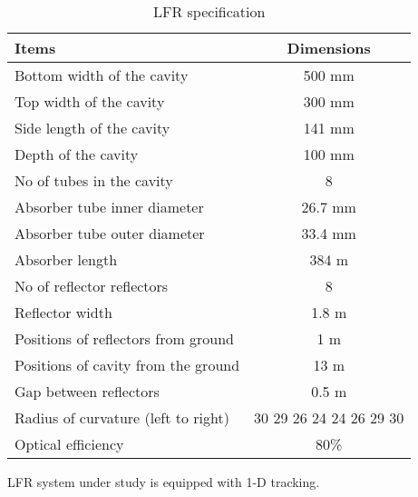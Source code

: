 \begin{table}[H]
\centering
\caption{LFR specification}
\label{lfrspectab}
\begin{tabular}{@{}|l|c|@{}}
\toprule
\textbf{Items}                      & \textbf{Dimensions} \\ \midrule
Bottom width of the cavity          & 500 mm              \\ \midrule
Top width of the cavity             & 300 mm              \\ \midrule
Side length of the cavity           & 141 mm              \\ \midrule
Depth of the cavity                 & 100 mm              \\ \midrule
No of tubes in the cavity           & 8                   \\ \midrule
Absorber tube inner diameter        & 26.7 mm             \\ \midrule
Absorber tube outer diameter        & 33.4 mm             \\ \midrule
Absorber length                     & 384 m               \\ \midrule
No of reflector reflectors             & 8                   \\ \midrule
Reflector width                     & 1.8 m               \\ \midrule
Positions of reflectors from ground & 1 m                 \\ \midrule
Positions of cavity from the ground & 13 m                \\ \midrule
Gap between reflectors                  & 0.5 m                   \\ \midrule
Radius of  curvature (left to right) & 30 29 26 24 24 26 29 30 \\ \midrule
Optical efficiency                   & 80\%                    \\ \bottomrule
\end{tabular}
\end{table}
LFR system under study is equipped with 1-D tracking.
